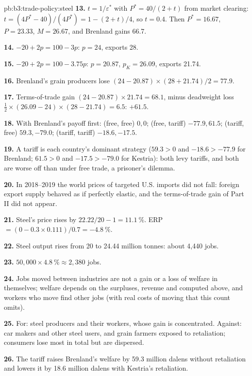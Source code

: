 \begin{solution}{pb:b3:trade-policy:steel}
\textbf{13.} $t = 1/\varepsilon^*$ with $P^* = 40/(2 + t)$ from market clearing: $t = (4P^* - 40)/(4P^*) =
1 - (2 + t)/4$, so $t = 0.4$. Then $P^* = 16.67$, $P = 23.33$, $M = 26.67$, and Brenland gains
66.7.

\textbf{14.} $-20 + 2p = 100 - 3p$: $p = 24$, exports 28.

\textbf{15.} $-20 + 2p = 100 - 3.75p$: $p = 20.87$, $p_K = 26.09$, exports 21.74.

\textbf{16.} Brenland's grain producers lose $(24 - 20.87) \times (28 + 21.74)/2 = 77.9$.

\textbf{17.} Terms-of-trade gain $(24 - 20.87) \times 21.74 = 68.1$, minus deadweight loss
$\tfrac12 \times (26.09 - 24) \times (28 - 21.74) = 6.5$: $+61.5$.

\textbf{18.} With Brenland's payoff first: (free, free) $0, 0$; (free, tariff) $-77.9,
61.5$; (tariff, free) $59.3, -79.0$; (tariff, tariff) $-18.6, -17.5$.

\textbf{19.} A tariff is each country's dominant strategy ($59.3 > 0$ and $-18.6 > -77.9$
for Brenland; $61.5 > 0$ and $-17.5 > -79.0$ for Kestria): both levy tariffs, and both
are worse off than under free trade, a prisoner's dilemma.

\textbf{20.} In 2018--2019 the world prices of targeted U.S. imports did not fall:
foreign export supply behaved as if perfectly elastic, and the terms-of-trade
gain of Part II did not appear. %

\textbf{21.} Steel's price rises by $22.22/20 - 1 = 11.1~\%$. ERP $= (0 - 0.3 \times 0.111)/0.7 =
-4.8~\%$.

\textbf{22.} Steel output rises from 20 to 24.44 million tonnes: about 4{,}440 jobs.

\textbf{23.} $50{,}000 \times 4.8~\% \approx 2{,}380$ jobs.

\textbf{24.} Jobs moved between industries are not a gain or a loss of welfare in
themselves; welfare depends on the surpluses, revenue and  computed
above, and workers who move find other jobs (with real costs of moving that this
count omits).

\textbf{25.} For: steel producers and their workers, whose gain is concentrated.
Against: car makers and other steel users, and grain farmers exposed to
retaliation; consumers lose most in total but are dispersed.

\textbf{26.} The tariff raises Brenland's welfare by 59.3 million dalens without
retaliation and lowers it by 18.6 million dalens with Kestria's retaliation.
\end{solution}
